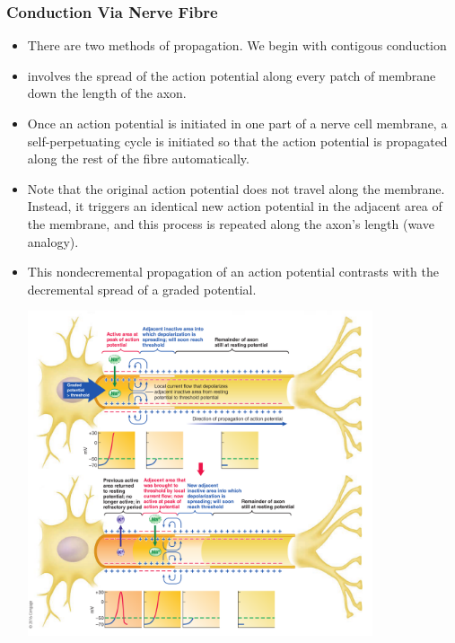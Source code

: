 \documentclass{article}
\numberwithin{equation}{section}
\begin{document}
\subsubsection{Conduction Via Nerve Fibre}
\begin{itemize}
    \item There are two methods of propagation. We begin with contigous conduction
    \item {} involves the spread of the action potential along every patch of membrane down the length of the axon.
    \item Once an action potential is initiated in one part of a nerve cell membrane, a self-perpetuating cycle is initiated so that the action potential is propagated along the rest of the fibre automatically.
    \item Note that the original action potential does not travel along
    the membrane. Instead, it triggers an identical new action potential in the adjacent area of the membrane, and this process is repeated along the axon’s length (wave analogy).
    \item This nondecremental propagation of an action potential contrasts with the decremental spread of a graded potential.
    \begin{center}
        \includegraphics[width=0.8\textwidth]{figures/contiguous.png}
    \end{center}
\end{itemize}
\end{document}
